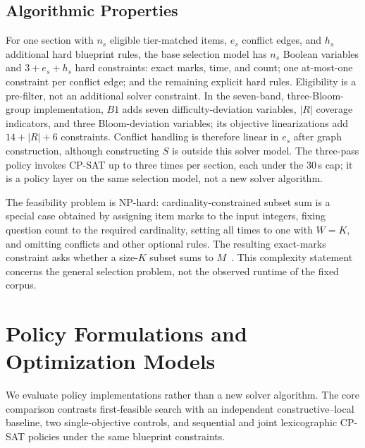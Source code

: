 \documentclass[runningheads]{llncs}
\begin{document}
\subsection{Algorithmic Properties}
For one section with $n_s$ eligible tier-matched items, $e_s$ conflict edges, and $h_s$ additional hard blueprint rules, the base selection model has $n_s$ Boolean variables and $3+e_s+h_s$ hard constraints: exact marks, time, and count; one at-most-one constraint per conflict edge; and the remaining explicit hard rules. Eligibility is a pre-filter, not an additional solver constraint. In the seven-band, three-Bloom-group implementation, $B1$ adds seven difficulty-deviation variables, $|R|$ coverage indicators, and three Bloom-deviation variables; its objective linearizations add $14+|R|+6$ constraints. Conflict handling is therefore linear in $e_s$ after graph construction, although constructing $S$ is outside this solver model. The three-pass policy invokes CP-SAT up to three times per section, each under the 30\,s cap; it is a policy layer on the same selection model, not a new solver algorithm.

The feasibility problem is NP-hard: cardinality-constrained subset sum is a special case obtained by assigning item marks to the input integers, fixing question count to the required cardinality, setting all times to one with $W=K$, and omitting conflicts and other optional rules. The resulting exact-marks constraint asks whether a size-$K$ subset sums to $M$~\cite{garey1979}. This complexity statement concerns the general selection problem, not the observed runtime of the fixed corpus.

\section{Policy Formulations and Optimization Models}
\label{sec:proposed}

We evaluate policy implementations rather than a new solver algorithm. The core comparison contrasts first-feasible search with an independent constructive--local baseline, two single-objective controls, and sequential and joint lexicographic CP-SAT policies under the same blueprint constraints.
\end{document}
